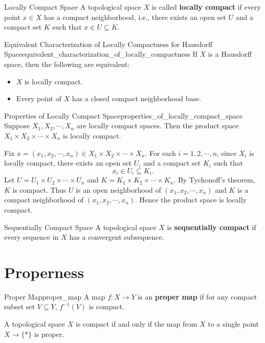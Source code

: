 \documentclass{report}
\begin{document}
\begin{definition}{Locally Compact Space}{}
	A topological space $X$ is called \textbf{locally compact} if every point $x\in X$ has a compact neighborhood, i.e., there exists an open set $U$ and a compact set $K$ such that $x \in U \subseteq K$.
\end{definition}


\begin{proposition}{Equivalent Characterization of Locally Compactness for Hausdorff Space}{equivalent_characterization_of_locally_compactness}
	If $X$ is a Hausdorff space, then the following are equivalent:
	\begin{itemize}
		\item $X$ is locally compact.
		\item Every point of $X$ has a closed compact neighborhood base.
	\end{itemize}
\end{proposition}


\begin{proposition}{Properties of Locally Compact Space}{properties_of_locally_compact_space}
	Suppose $X_1, X_2, \cdots, X_n$ are locally compact spaces. Then the product space $X_1 \times X_2 \times \cdots \times X_n$ is locally compact.
\end{proposition}
\begin{prf}
	Fix $x=(x_1,x_2,\cdots,x_n)\in X_1\times X_2\times\cdots\times X_n$. For each $i=1,2,\cdots,n$, since $X_i$ is locally compact, there exists an open set $U_i$ and a compact set $K_i$ such that
	\[
	x_i\in U_i\subseteq K_i.
	\]
	Let $U=U_1\times U_2\times\cdots\times U_n$ and $K=K_1\times K_2\times\cdots\times K_n$. By Tychonoff's theorem, $K$ is compact. Thus $U$ is an open neighborhood of $(x_1,x_2,\cdots,x_n)$ and $K$ is a compact neighborhood of $(x_1,x_2,\cdots,x_n)$. Hence the product space is locally compact.
\end{prf}


\begin{definition}{Sequentially Compact Space}{}
	A topological space $X$ is \textbf{sequentially compact} if every sequence in $X$ has a convergent subsequence.
\end{definition}

\section{Properness}
\begin{definition}{Proper Map}{proper_map}
	A map $f:X\to Y$ is an \textbf{proper map} if for any compact subset set $V\subseteq Y$, $f^{-1}(V)$ is compact.
\end{definition}
\begin{proposition}{}{}
	A topological space $X$ is compact if and only if the map from $X$ to a single point $X\to\{*\}$ is proper.
\end{proposition}
\end{document}
